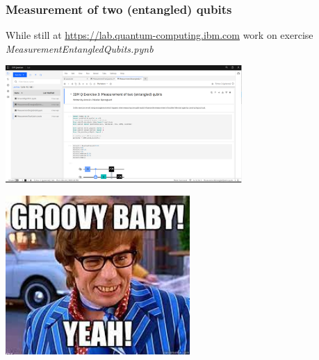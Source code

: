 \documentclass[10pt]{beamer}
\begin{document}
\begin{frame}
  \frametitle{Measurement of two (entangled) qubits}
While still at \href{https://lab.quantum-computing.ibm.com}{https://lab.quantum-computing.ibm.com} work on exercise \emph{MeasurementEntangledQubits.pynb}

  \begin{center}
\includegraphics[width=9cm]{img/ibmq-entangled-qubits.png}
    \end{center}
\end{frame}
\begin{frame}
  \centering
  \includegraphics[width=7cm]{img/groovy-baby.jpeg}

\end{frame}
\end{document}

